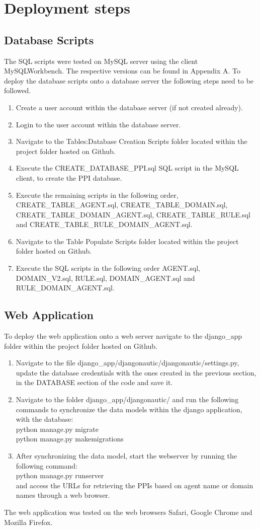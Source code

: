 \documentclass[msc,deptreport,ai]{infthesis}      %
\begin{document}
\section{Deployment steps}
\subsection{Database Scripts}
 The SQL scripts were tested on MySQL server using the client MySQLWorkbench. The respective versions can be found in Appendix A. To deploy the database scripts onto a database server the following steps need to be followed.
 \begin{enumerate}
 	\item Create a user account within the database server (if not created already).
 	\item Login to the user account within the database server.
 	\item Navigate to the Tables:Database Creation Scripts folder located within the project folder hosted on Github. 
 	\item Execute the CREATE\_DATABASE\_PPI.sql SQL script in the MySQL client, to create the PPI database.
 	\item Execute the remaining scripts in the following order, CREATE\_TABLE\_AGENT.sql, CREATE\_TABLE\_DOMAIN.sql, CREATE\_TABLE\_DOMAIN\_AGENT.sql, CREATE\_TABLE\_RULE.sql and CREATE\_TABLE\_RULE\_DOMAIN\_AGENT.sql.
 	\item Navigate to the Table Populate Scripts folder located within the project folder hosted on Github.
 	\item Execute the SQL scripts in the following order AGENT.sql, DOMAIN\_V2.sql, RULE.sql, DOMAIN\_AGENT.sql and RULE\_DOMAIN\_AGENT.sql.
 \end{enumerate}
\subsection{Web Application}
To deploy the web application onto a web server navigate to the django\_app folder within the project folder hosted on Github.
\begin{enumerate}
	\item Navigate to the file django\_app/djangonautic/djangonautic/settings.py, update the database credentials with the ones created in the previous section, in the DATABASE section of the code and save it.
	\item Navigate to the folder django\_app/djangonautic/ and run the following commands to synchronize the data models within the django application, with the database:\\
	python manage.py migrate \\
	python manage.py makemigrations
	\item After synchronizing the data model, start the webserver by running the following command:\\
	python manage.py runserver\\
	and access the URLs for retrieving the PPIs based on agent name or domain names through a web browser.	
\end{enumerate}
The web application was tested on the web browsers Safari, Google Chrome and Mozilla Firefox.
\end{document}
